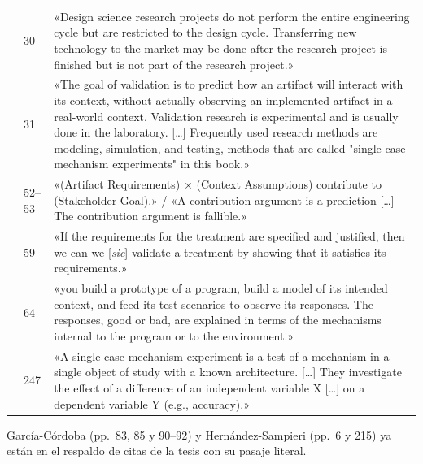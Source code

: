 \documentclass[11pt,a4paper]{article}
\begin{document}
{\begin{longtable}{L{2.6cm}L{1.3cm}L{11.8cm}}
 & 30 & «Design science research projects do not perform the entire engineering cycle but are restricted to the design cycle. Transferring new technology to the market may be done after the research project is finished but is not part of the research project.» \\
 & 31 & «The goal of validation is to predict how an artifact will interact with its context, without actually observing an implemented artifact in a real-world context. Validation research is experimental and is usually done in the laboratory. [\dots] Frequently used research methods are modeling, simulation, and testing, methods that are called "single-case mechanism experiments" in this book.» \\
 & 52--53 & «(Artifact Requirements) $\times$ (Context Assumptions) contribute to (Stakeholder Goal).» / «A contribution argument is a prediction [\dots] The contribution argument is fallible.» \\
 & 59 & «If the requirements for the treatment are specified and justified, then we can we [\emph{sic}] validate a treatment by showing that it satisfies its requirements.» \\
 & 64 & «you build a prototype of a program, build a model of its intended context, and feed its test scenarios to observe its responses. The responses, good or bad, are explained in terms of the mechanisms internal to the program or to the environment.» \\
 & 247 & «A single-case mechanism experiment is a test of a mechanism in a single object of study with a known architecture. [\dots] They investigate the effect of a difference of an independent variable X [\dots] on a dependent variable Y (e.g., accuracy).» \\
\bottomrule
\end{longtable}}

García-Córdoba (pp.~83, 85 y 90--92) y Hernández-Sampieri (pp.~6 y 215) ya están en el respaldo de citas de la tesis con su pasaje literal.
\end{document}
